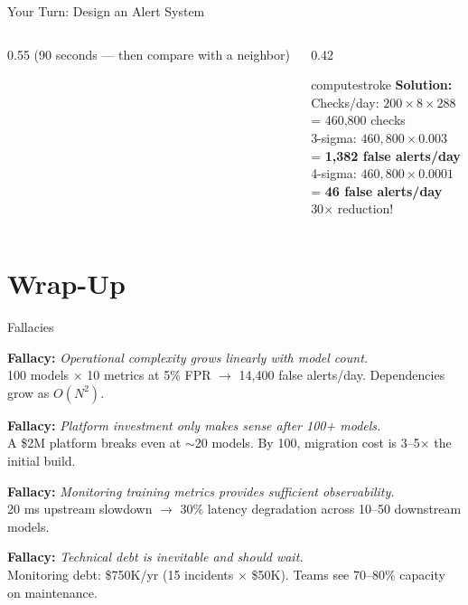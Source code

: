 \documentclass[aspectratio=169, 12pt]{beamer}
\begin{document}
\begin{frame}{Your Turn: Design an Alert System}
\begin{columns}[T]
\begin{column}{0.55\textwidth}
    {\footnotesize\textcolor{midgray}{(90 seconds --- then compare with a neighbor)}}
  \end{column}
  \begin{column}{0.42\textwidth}
    \pause
    \begin{mlsyscard}{computestroke}
    \textbf{Solution:}\\[0.1cm]
    {\footnotesize
    Checks/day: $200 \times 8 \times 288$\\
    = 460,800 checks\\[0.1cm]
    3-sigma: $460{,}800 \times 0.003$\\
    = \textcolor{errorstroke}{\textbf{1,382 false alerts/day}}\\[0.1cm]
    4-sigma: $460{,}800 \times 0.0001$\\
    = \textcolor{datastroke}{\textbf{46 false alerts/day}}\\[0.1cm]
    30$\times$ reduction!
    }
    \end{mlsyscard}
  \end{column}
\end{columns}

\end{frame}

\section{Wrap-Up}

\begin{frame}{Fallacies}

\footnotesize
\textbf{Fallacy:} \textit{Operational complexity grows linearly with model count.}\\
100 models $\times$ 10 metrics at 5\% FPR $\to$ 14,400 false alerts/day. Dependencies grow as $O(N^2)$.

\vspace{0.08cm}
\textbf{Fallacy:} \textit{Platform investment only makes sense after 100+ models.}\\
A \$2M platform breaks even at $\sim$20 models. By 100, migration cost is 3--5$\times$ the initial build.

\vspace{0.08cm}
\textbf{Fallacy:} \textit{Monitoring training metrics provides sufficient observability.}\\
20 ms upstream slowdown $\to$ 30\% latency degradation across 10--50 downstream models.

\vspace{0.08cm}
\textbf{Fallacy:} \textit{Technical debt is inevitable and should wait.}\\
Monitoring debt: \$750K/yr (15 incidents $\times$ \$50K). Teams see 70--80\% capacity on maintenance.

\end{frame}
\end{document}
